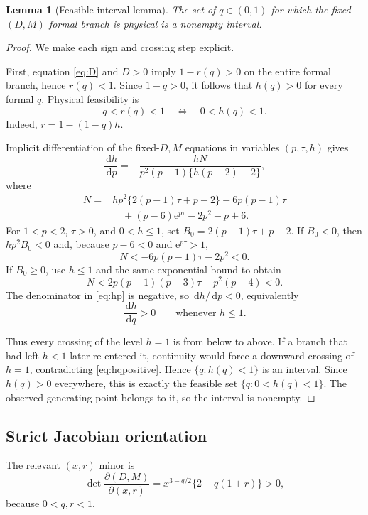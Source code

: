 \documentclass[11pt]{article}
\newtheorem{lemma}[theorem]{Lemma}
\newcommand{\e}{\mathrm e}
\newcommand{\dd}{\,\mathrm d}
\begin{document}
\begin{lemma}[Feasible-interval lemma]\label{lem:feasible}
The set of $q\in(0,1)$ for which the fixed-$(D,M)$ formal branch is physical is a nonempty interval.
\end{lemma}
\begin{proof}
We make each sign and crossing step explicit.

First, equation \eqref{eq:D} and $D>0$ imply $1-r(q)>0$ on the entire formal branch, hence $r(q)<1$.  Since $1-q>0$, it follows that $h(q)>0$ for every formal $q$.  Physical feasibility is
\[
q<r(q)<1
\quad\Longleftrightarrow\quad
0<h(q)<1.
\]
Indeed, $r=1-(1-q)h$.

Implicit differentiation of the fixed-$D,M$ equations in variables $(p,\tau,h)$ gives
\begin{equation}\label{eq:hp}
\frac{\dd h}{\dd p}
=-\frac{hN}{p^2(p-1)\{h(p-2)-2\}},
\end{equation}
where
\begin{align*}
N={}&hp^2\{2(p-1)\tau+p-2\}-6p(p-1)\tau\\
&\quad +(p-6)\e^{p\tau}-2p^2-p+6.
\end{align*}
For $1<p<2$, $\tau>0$, and $0<h\le1$, set
$B_0=2(p-1)\tau+p-2$.  If $B_0<0$, then $hp^2B_0<0$ and, because $p-6<0$ and $\e^{p\tau}>1$,
\[
N<-6p(p-1)\tau-2p^2<0.
\]
If $B_0\ge0$, use $h\le1$ and the same exponential bound to obtain
\[
N<2p(p-1)(p-3)\tau+p^2(p-4)<0.
\]
The denominator in \eqref{eq:hp} is negative, so $\dd h/\dd p<0$, equivalently
\begin{equation}\label{eq:hqpositive}
\frac{\dd h}{\dd q}>0\qquad\text{whenever }h\le1.
\end{equation}

Thus every crossing of the level $h=1$ is from below to above.  If a branch that had left $h<1$ later re-entered it, continuity would force a downward crossing of $h=1$, contradicting \eqref{eq:hqpositive}.  Hence $\{q:h(q)<1\}$ is an interval.  Since $h(q)>0$ everywhere, this is exactly the feasible set $\{q:0<h(q)<1\}$.  The observed generating point belongs to it, so the interval is nonempty.
\end{proof}

\subsection{Strict Jacobian orientation}
The relevant $(x,r)$ minor is
\begin{equation}\label{eq:minor}
\det\frac{\partial(D,M)}{\partial(x,r)}
=x^{3-q/2}\{2-q(1+r)\}>0,
\end{equation}
because $0<q,r<1$.
\end{document}
